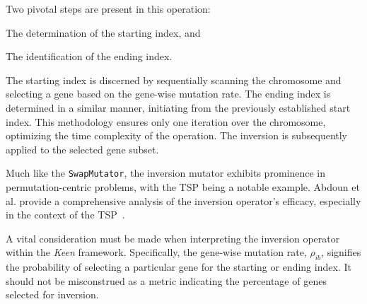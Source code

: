  Two pivotal steps are present in this operation: 
  \begin{enumerate*}
    \item The determination of the starting index, and
    \item The identification of the ending index.
  \end{enumerate*}

  The starting index is discerned by sequentially scanning the chromosome and 
  selecting a gene based on the gene-wise mutation rate. The ending index is 
  determined in a similar manner, initiating from the previously established 
  start index. This methodology ensures only one iteration over the chromosome, 
  optimizing the time complexity of the operation. The inversion is 
  subsequently applied to the selected gene subset.

  Much like the \texttt{SwapMutator}, the inversion mutator exhibits prominence 
  in permutation-centric problems, with the TSP being a notable example. Abdoun 
  et al. provide a comprehensive analysis of the inversion operator's efficacy, 
  especially in the context of the TSP~\autocite{abdounAnalyzingPerformanceMutation2012}.

  \begin{remark}
    A vital consideration must be made when interpreting the inversion operator 
    within the \textit{Keen} framework. Specifically, the gene-wise mutation 
    rate, \(\rho_{ib}\), signifies the probability of selecting a particular gene 
    for the starting or ending index. It should not be misconstrued as a metric 
    indicating the percentage of genes selected for inversion.
  \end{remark}
